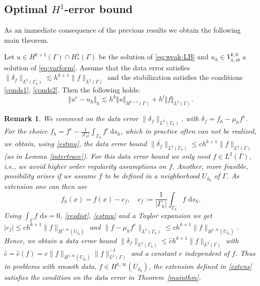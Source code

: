\documentclass[final]{siamltex}
\newtheorem{remark}{Remark}
\begin{document}
\subsection{Optimal $H^1$-error bound}
As an immediate consequence of the previous results we obtain the following main theorem.
\begin{theorem} \label{mainthm}
Let $u \in H^{k+1}(\Gamma)\cap H_\ast^1(\Gamma)$ be the solution of \eqref{eq:weak-LB} and $u_h \in {V_{h,\Theta}^{k,0}}$ a solution of \eqref{eq:varform}. Assume that the data error satisfies $\|\delta_f\|_{L^2(\Gamma_h)} \lesssim h^{k+1} \|f\|_{L^2(\Gamma)}$ and the stabilization satisfies the conditions \eqref{conds1}, \eqref{conds2}. Then the following holds:
\begin{equation}
  {\Vert {u^e - u_h } \Vert_h} \lesssim h^k \Vert u \Vert_{H^{k+1}(\Gamma)} + h^{l} \Vert f \Vert_{L^2(\Gamma)}.
\end{equation}
\end{theorem}
\begin{remark} \rm
\label{daterror}
 We comment on the data error $\|\delta_f\|_{L^2(\Gamma_h)}$, with $\delta_f=f_h -\mu_h f^e$. For the choice $f_h= f^e- \frac{1}{|\Gamma_h|} \int_{\Gamma_h} f^e {\,\mathrm{d} {s_h}}$, which in practice often can \emph{not} be realized, we obtain, using \eqref{estmu}, the data error bound $\| \delta_f\|_{L^2(\Gamma_h)} \leq c h^{k+1} \|f\|_{L^2(\Gamma)}$ (as in Lemma \ref{intertrace}). For this data error bound we only need $f \in L^2(\Gamma)$, i.e., we avoid higher order regularity assumptions on $f$. Another, more feasible, possibility arises if we assume $f$ to be defined in a neighborhood $U_{\delta_0}$ of $\Gamma$. As extension one can then use
\begin{equation} \label{extens}
 f_h(x)= f(x)- c_f, \quad c_f:=\frac{1}{|\Gamma_h|} \int_{\Gamma_h} f\, {\,\mathrm{d} {s_h}}.
\end{equation}
Using $\int_{\Gamma} f \, {\,\mathrm{d} {s}}=0$, \eqref{resdist}, \eqref{estmu} and a Taylor expansion we get $|c_f| \leq c h^{k+1} \|f\|_{H^{1,\infty}(U_{\delta_0})}$ and $\|f- \mu_h f^e\|_{L^2(\Gamma_h)} \leq c h^{k+1} \|f\|_{H^{1,\infty}(U_{\delta_0})}$. Hence, we obtain a data error bound $\|\delta_f\|_{L^2(\Gamma_h)} \leq \hat c h^{k+1}\|f\|_{L^2(\Gamma)}$ with $\hat c=\hat c(f)=c \|f\|_{H^{1,\infty}(U_{\delta_0})} \|f\|_{L^2(\Gamma)}^{-1}$ and a constant $c$ independent of $f$. Thus in problems with smooth data, $ f \in H^{1,\infty}(U_{\delta_0})$, the extension defined in \eqref{extens} satisfies the condition on the data error in Theorem~\ref{mainthm}.
\end{remark}
\end{document}
